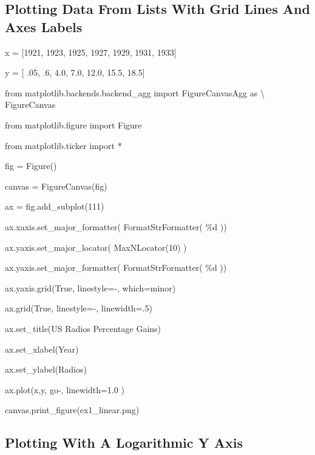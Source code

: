 \documentclass[12pt,twoside]{book}
\begin{document}
\subsection[Plotting Data From Lists With Grid Lines And Axes Labels]{
Plotting Data From Lists With Grid Lines And Axes Labels}


\bigskip

x = [1921, 1923, 1925, 1927, 1929, 1931, 1933]

y = [ .05, .6, 4.0, 7.0, 12.0, 15.5, 18.5]


\bigskip

from matplotlib.backends.backend\_agg import FigureCanvasAgg as
{\textbackslash} FigureCanvas

from matplotlib.figure import Figure

from matplotlib.ticker import *

fig = Figure()

canvas = FigureCanvas(fig)

ax = fig.add\_subplot(111)

ax.xaxis.set\_major\_formatter( FormatStrFormatter(
{\textquotesingle}\%d{\textquotesingle} ))

ax.yaxis.set\_major\_locator( MaxNLocator(10) )

ax.yaxis.set\_major\_formatter( FormatStrFormatter(
{\textquotesingle}\%d{\textquotesingle} ))

ax.yaxis.grid(True, linestyle={\textquotesingle}{}-{\textquotesingle},
which={\textquotesingle}minor{\textquotesingle})

ax.grid(True, linestyle={\textquotesingle}{}-{\textquotesingle},
linewidth=.5)

ax.set\_title({\textquotesingle}US Radios Percentage
Gains{\textquotesingle})

ax.set\_xlabel({\textquotesingle}Year{\textquotesingle})

ax.set\_ylabel({\textquotesingle}Radios{\textquotesingle})

ax.plot(x,y, {\textquotesingle}go{}-{\textquotesingle}, linewidth=1.0 )

canvas.print\_figure({\textquotesingle}ex1\_linear.png{\textquotesingle})

{\textbar}


\bigskip

\subsection[Plotting With A Logarithmic Y Axis]{
Plotting With A Logarithmic Y Axis}
\end{document}
